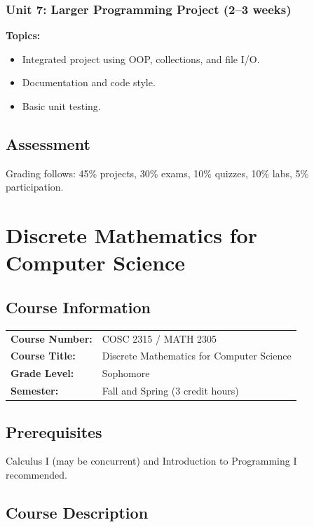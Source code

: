 \documentclass[12pt,oneside]{book}
\begin{document}
\subsection{Unit 7: Larger Programming Project (2--3 weeks)}

\textbf{Topics:}
\begin{itemize}
    \item Integrated project using OOP, collections, and file I/O.
    \item Documentation and code style.
    \item Basic unit testing.
\end{itemize}

\section{Assessment}

Grading follows: 45\% projects, 30\% exams, 10\% quizzes, 10\% labs, 5\% participation.


\chapter{Discrete Mathematics for Computer Science}

\section{Course Information}

\begin{tabular}{ll}
\textbf{Course Number:} & COSC 2315 / MATH 2305 \\
\textbf{Course Title:} & Discrete Mathematics for Computer Science \\
\textbf{Grade Level:} & Sophomore \\
\textbf{Semester:} & Fall and Spring (3 credit hours) \\
\end{tabular}

\section{Prerequisites}

Calculus I (may be concurrent) and Introduction to Programming I recommended.

\section{Course Description}
\end{document}

